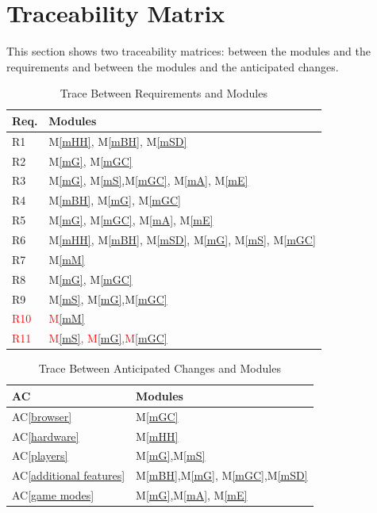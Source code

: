 \documentclass[12pt, titlepage]{article}
\newcommand{\acref}[1]{AC\ref{#1}}
\newcommand{\mref}[1]{M\ref{#1}}
\begin{document}
\section{Traceability Matrix} \label{SecTM}

This section shows two traceability matrices: between the modules and the
requirements and between the modules and the anticipated changes.


\begin{table}[H]
\centering
\begin{tabular}{p{} p{}}
\toprule
\textbf{Req.} & \textbf{Modules}\\
\midrule
R1 & \mref{mHH}, \mref{mBH}, \mref{mSD} \\
R2 & \mref{mG}, \mref{mGC}\\
R3 & \mref{mG}, \mref{mS},\mref{mGC}, \mref{mA}, \mref{mE}\\
R4 & \mref{mBH}, \mref{mG}, \mref{mGC}\\
R5 & \mref{mG}, \mref{mGC}, \mref{mA}, \mref{mE}\\
R6 & \mref{mHH}, \mref{mBH}, \mref{mSD}, \mref{mG}, \mref{mS}, \mref{mGC}\\
R7 & \mref{mM}\\
R8 & \mref{mG}, \mref{mGC}\\
R9 & \mref{mS}, \mref{mG},\mref{mGC}\\
\textcolor{red}{R10} & \textcolor{red}{\mref{mM}}\\
\textcolor{red}{R11} & \textcolor{red}{\mref{mS}, \mref{mG},\mref{mGC}}\\
\bottomrule
\end{tabular}
\caption{Trace Between Requirements and Modules}
\label{TblRT}
\end{table}
\begin{table}[H]
\centering
\begin{tabular}{p{} p{}}
\toprule
\textbf{AC} & \textbf{Modules}\\
\midrule
\acref{browser} &\mref{mGC}\\
\acref{hardware} & \mref{mHH}\\
\acref{players} & \mref{mG},\mref{mS} \\
\acref{additional features} & \mref{mBH},\mref{mG}, \mref{mGC},\mref{mSD}\\
\acref{game modes} &\mref{mG},\mref{mA}, \mref{mE}\\
\bottomrule
\end{tabular}
\caption{Trace Between Anticipated Changes and Modules}
\label{TblACT}
\end{table}
\end{document}

